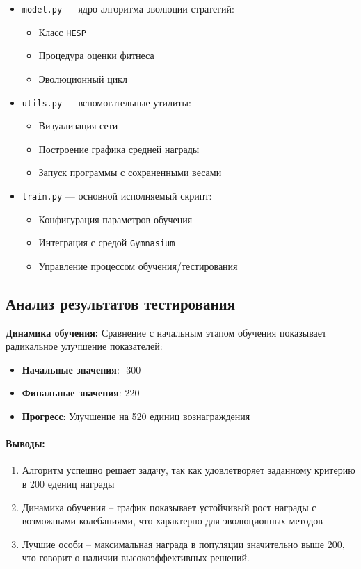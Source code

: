 \documentclass[a4paper,12pt]{article}
\begin{document}
\begin{itemize}
\begin{itemize}
	\item \texttt{model.py} --- ядро алгоритма эволюции стратегий:
	\begin{itemize}
		\item Класс \texttt{HESP}
		\item Процедура оценки фитнеса
		\item Эволюционный цикл
	\end{itemize}
	

	
	\item \texttt{utils.py} --- вспомогательные утилиты:
	\begin{itemize}
		\item Визуализация сети
        \item Построение графика средней награды
        \item Запуск программы с сохраненными весами
	\end{itemize}
	
	\item \texttt{train.py} --- основной исполняемый скрипт:
	\begin{itemize}
		\item Конфигурация параметров обучения
		\item Интеграция с средой \texttt{Gymnasium}
		\item Управление процессом обучения/тестирования
	\end{itemize}
\end{itemize}
	
	






\subsection{Анализ результатов тестирования}

\textbf{Динамика обучения:}
Сравнение с начальным этапом обучения показывает радикальное улучшение показателей:
\begin{itemize}
	\item \textbf{Начальные значения}: -300  
	\item \textbf{Финальные значения}: 220 
	\item \textbf{Прогресс}: Улучшение на 520 единиц вознаграждения
\end{itemize}




\paragraph{Выводы:}
\begin{enumerate}
	\item Алгоритм успешно решает задачу, так как удовлетворяет заданному критерию в 200 едениц награды
	\item Динамика обучения – график показывает устойчивый рост награды с возможными колебаниями, что характерно для эволюционных методов
	\item Лучшие особи – максимальная награда в популяции значительно выше 200, что говорит о наличии высокоэффективных решений.
\end{enumerate}


\end{itemize}
\end{document}
